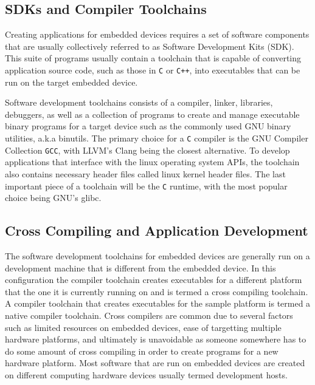 
\subsection{SDKs and Compiler Toolchains}

Creating applications for embedded devices requires a set of software components that are usually collectively referred to as Software Development Kits (SDK). This suite of programs usually contain a toolchain that is capable of converting application source code, such as those in \texttt{C}  or \texttt{C++}, into executables that can be run on the target embedded device.

Software development toolchains consists of a compiler, linker, libraries, debuggers, as well as a collection of programs to create and manage executable binary programs for a target device such as the commonly used GNU binary utilities, a.k.a binutils. The primary choice for a \texttt{C} compiler is the GNU Compiler Collection \texttt{GCC}, with LLVM's Clang being the closest alternative. To develop applications that interface with the linux operating system APIs, the toolchain also contains necessary header files called linux kernel header files. The last important piece of a toolchain will be the \texttt{C} runtime, with the most popular choice being GNU's glibc.

\subsection{Cross Compiling and Application Development}

The software development toolchains for embedded devices are generally run on a development machine that is different from the embedded device. In this configuration the compiler toolchain creates executables for a different platform that the one it is currently running on and is termed a cross compiling toolchain. A compiler toolchain that creates executables for the sample platform is termed a native compiler toolchain. Cross compilers are common due to several factors such as limited resources on embedded devices, ease of targetting multiple hardware platforms, and ultimately is unavoidable as someone somewhere has to do some amount of cross compiling in order to create programs for a new hardware platform. Most software that are run on embedded devices are created on different computing hardware devices usually termed development hosts.

